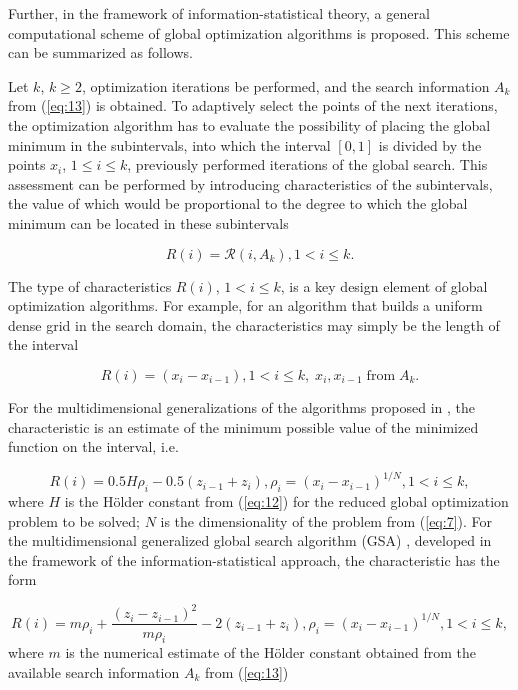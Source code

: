 \documentclass[review]{elsarticle}
\begin{document}
Further, in the framework of information-statistical theory, a general computational scheme of global optimization algorithms is proposed. This scheme can be summarized as follows.

Let $k$, $k \geq 2$, optimization iterations be performed, and the search information $A_k$ from (\ref{eq:13}) is obtained. To adaptively select the points of the next iterations, the optimization algorithm has to evaluate the possibility of placing the global minimum in the subintervals, into which the interval $[0,1]$ is divided by the points $x_i$, $1 \leq i \leq k$, previously performed iterations of the global search. This assessment can be performed by introducing characteristics of the subintervals, the value of which would be proportional to the degree to which the global minimum can be located in these subintervals

\begin{equation}\label{eq:15}
R(i)=\mathcal{R} (i,A_k ), 1 < i \leq k.
\end{equation}

The type of characteristics $R(i)$, $1 < i \leq k$, is a key design element of global optimization algorithms. For example, for an algorithm that builds a uniform dense grid in the search domain, the characteristics may simply be the length of the interval

\begin{equation}\label{eq:16}
R(i)=(x_i-x_{i-1}), 1 < i \leq k, \; x_i, x_{i-1} \; \mathrm{from} \; A_k.
\end{equation}

For the multidimensional generalizations of the algorithms proposed in \cite{c22,c23}, the characteristic is an estimate of the minimum possible value of the minimized function on the interval, i.e.

\begin{equation}\label{eq:17}
R(i)=0.5 H \rho_i - 0.5 (z_{i-1} + z_i), \rho_i=(x_i - x_{i-1})^{1/N}, 1 < i \leq k,
\end{equation}
where $H$ is the H\"older constant from (\ref{eq:12}) for the reduced global optimization problem to be solved; $N$ is the dimensionality of the problem from (\ref{eq:7}). For the multidimensional generalized global search algorithm (GSA) \cite{c5,c24}, developed in the framework of the information-statistical approach, the characteristic has the form

\begin{equation}\label{eq:18}
R(i)=m \rho_i+\frac{(z_i-z_{i-1})^2}{m \rho_i }-2(z_{i-1}+z_i ), \rho_i=(x_i-x_{i-1})^{1/N}  ,1 < i \leq k,
\end{equation}
where $m$ is the numerical estimate of the H\"older constant obtained from the available search information $A_k$ from (\ref{eq:13})
\end{document}
